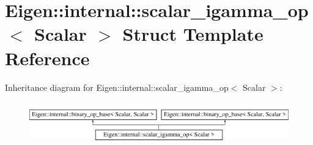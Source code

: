 \hypertarget{struct_eigen_1_1internal_1_1scalar__igamma__op}{}\section{Eigen\+:\+:internal\+:\+:scalar\+\_\+igamma\+\_\+op$<$ Scalar $>$ Struct Template Reference}
\label{struct_eigen_1_1internal_1_1scalar__igamma__op}
Inheritance diagram for Eigen\+:\+:internal\+:\+:scalar\+\_\+igamma\+\_\+op$<$ Scalar $>$\+:\begin{figure}[H]
\begin{center}
\leavevmode
\includegraphics[height=1.842105cm]{struct_eigen_1_1internal_1_1scalar__igamma__op}
\end{center}
\end{figure}
